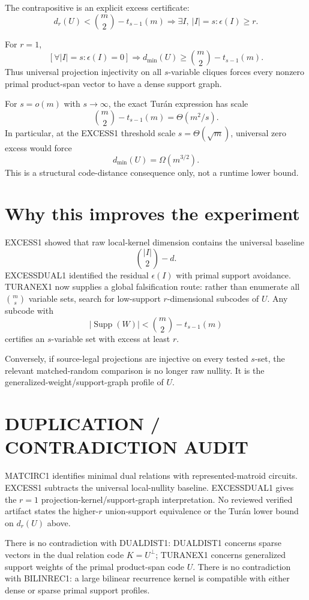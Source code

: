 \documentclass[11pt]{article}
\begin{document}
The contrapositive is an explicit excess certificate:
\[
\boxed{
d_r(U)<
\binom m2-t_{s-1}(m)
\Longrightarrow
\exists I,\ |I|=s:\epsilon(I)\ge r.
}
\]

For $r=1$,
\[
\boxed{
\left[\forall |I|=s:\epsilon(I)=0\right]
\Longrightarrow
d_{\min}(U)\ge
\binom m2-t_{s-1}(m).
}
\]
Thus universal projection injectivity on all $s$-variable cliques forces every nonzero primal product-span vector to have a dense support graph.

For $s=o(m)$ with $s\to\infty$, the exact Tur\'an expression has scale
\[
\binom m2-t_{s-1}(m)=\Theta(m^2/s).
\]
In particular, at the EXCESS1 threshold scale $s=\Theta(\sqrt m)$, universal zero excess would force
\[
d_{\min}(U)=\Omega(m^{3/2}).
\]
This is a structural code-distance consequence only, not a runtime lower bound.

\section*{Why this improves the experiment}
EXCESS1 showed that raw local-kernel dimension contains the universal baseline
\[
\binom{|I|}{2}-d.
\]
EXCESSDUAL1 identified the residual $\epsilon(I)$ with primal support avoidance. TURANEX1 now supplies a global falsification route: rather than enumerate all $\binom ms$ variable sets, search for low-support $r$-dimensional subcodes of $U$. Any subcode with
\[
|\operatorname{Supp}(W)|<
\binom m2-t_{s-1}(m)
\]
certifies an $s$-variable set with excess at least $r$.

Conversely, if source-legal projections are injective on every tested $s$-set, the relevant matched-random comparison is no longer raw nullity. It is the generalized-weight/support-graph profile of $U$.

\section*{DUPLICATION / CONTRADICTION AUDIT}
MATCIRC1 identifies minimal dual relations with represented-matroid circuits. EXCESS1 subtracts the universal local-nullity baseline. EXCESSDUAL1 gives the $r=1$ projection-kernel/support-graph interpretation. No reviewed verified artifact states the higher-$r$ union-support equivalence or the Tur\'an lower bound on $d_r(U)$ above.

There is no contradiction with DUALDIST1: DUALDIST1 concerns sparse vectors in the dual relation code $K=U^\perp$; TURANEX1 concerns generalized support weights of the primal product-span code $U$. There is no contradiction with BILINREC1: a large bilinear recurrence kernel is compatible with either dense or sparse primal support profiles.
\end{document}
